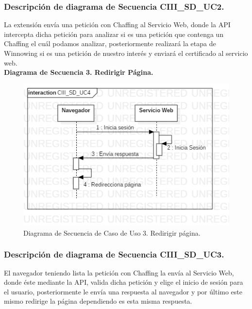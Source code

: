 \documentclass[12pt, a4paper, titlepage]{report}
\begin{document}
                \subsubsection{Descripción de diagrama de Secuencia CIII\_SD\_UC2.}
                La extensión envía una petición con Chaffing al Servicio Web, donde la API intercepta dicha petición para analizar si es una petición que contenga un Chaffing el cuál podamos analizar, posteriormente realizará la etapa de Winnowing si es una petición de nuestro interés y enviará el certificado al servicio web.\\
        
                \textbf{Diagrama de Secuencia 3. Redirigir Página.} 
                \begin{figure}[H]
                	\begin{center}	\includegraphics[width=12cm]{./imagenes/Disenio/Componente_3/CIII_SD_UC4.png}
                	\caption{Diagrama de Secuencia de Caso de Uso 3. Redirigir página.}
                	\end{center}
        		\end{figure}
    		
                \subsubsection{Descripción de diagrama de Secuencia CIII\_SD\_UC3.}
                El navegador teniendo lista la petición con Chaffing la envía al Servicio Web, donde éste mediante la API, valida dicha petición y elige el inicio de sesión para el usuario, posteriormente le envía una respuesta al navegador y por último este mismo redirige la página dependiendo es esta misma respuesta.
            
\end{document}
